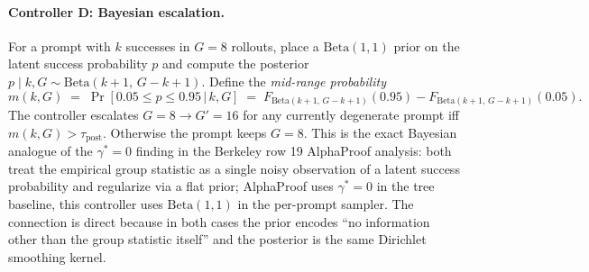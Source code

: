 \paragraph{Controller D: Bayesian escalation.}
For a prompt with $k$ successes in $G{=}8$ rollouts, place a
$\mathrm{Beta}(1,1)$ prior on the latent success probability $p$ and
compute the posterior
$p \mid k, G \sim \mathrm{Beta}(k{+}1,\, G{-}k{+}1)$. Define the
\emph{mid-range probability}
\begin{equation}
m(k, G) \;=\; \Pr\!\left[0.05 \le p \le 0.95 \,\big|\, k, G\right]
\;=\; F_{\mathrm{Beta}(k+1,\, G-k+1)}(0.95) - F_{\mathrm{Beta}(k+1,\, G-k+1)}(0.05).
\label{eq:zvf-midrange}
\end{equation}
The controller escalates $G{=}8 \to G'{=}16$ for any currently
degenerate prompt iff $m(k, G) > \tau_{\mathrm{post}}$. Otherwise the
prompt keeps $G{=}8$. This is the exact Bayesian analogue of the
$\gamma^*{=}0$ finding in the Berkeley row 19 AlphaProof analysis:
both treat the empirical group statistic as a single noisy
observation of a latent success probability and regularize via a
flat prior; AlphaProof uses $\gamma^*{=}0$ in the tree baseline,
this controller uses $\mathrm{Beta}(1,1)$ in the per-prompt sampler.
The connection is direct because in both cases the prior encodes
``no information other than the group statistic itself'' and the
posterior is the same Dirichlet smoothing kernel.

